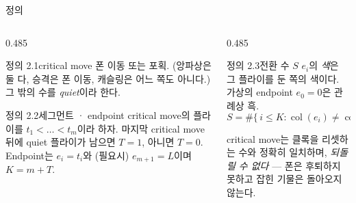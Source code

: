 \documentclass[aspectratio=169,10pt]{beamer}
\begin{document}
\begin{frame}{정의}
  \centering
  \par\vspace{0.4cm}
  \begin{columns}[t]
    \begin{column}{0.485\textwidth}
      \begin{lcstate}{정의 2.1}{critical move}
        {\small 폰 이동 또는 포획. (앙파상은 둘 다, 승격은 폰 이동,
        캐슬링은 어느 쪽도 아니다.) 그 밖의 수를 \emph{quiet}이라 한다.}
      \end{lcstate}
      \begin{lcstate}{정의 2.2}{세그먼트 · endpoint}
        {\small critical move의 플라이를 $t_1<\dots<t_m$이라 하자.
        마지막 critical move 뒤에 quiet 플라이가 남으면 $T=1$, 아니면
        $T=0$. Endpoint는 $e_i=t_i$와 (필요시) $e_{m+1}=L$이며
        $K=m+T$.}
      \end{lcstate}
    \end{column}
    \begin{column}{0.485\textwidth}
      \begin{lcstate}{정의 2.3}{전환 수 $S$}
        {\small $e_i$의 \emph{색}은 그 플라이를 둔 쪽의 색이다.
        가상의 endpoint $e_0=0$은 관례상 흑.
        \[
          S=\#\{\,i\le K:\operatorname{col}(e_i)\ne
              \operatorname{col}(e_{i-1})\,\}.
        \]}
      \end{lcstate}
      \vspace{0.1cm}
      {\small critical move는 클록을 리셋하는 수와 정확히 일치하며,
      \emph{되돌릴 수 없다} --- 폰은 후퇴하지 못하고 잡힌 기물은 돌아오지
      않는다.}
    \end{column}
  \end{columns}
\end{frame}
\end{document}

